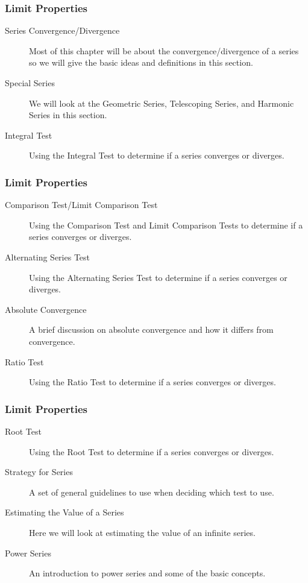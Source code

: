 \documentclass{beamer}
\begin{document}
\begin{frame}[fragile]
	\frametitle{Limit Properties}
	\Large
	\begin{description}
		\item[Series Convergence/Divergence]  Most of this chapter will be about the convergence/divergence of a series so we will give the basic ideas and definitions in this section.
 
\item[Special Series]  We will look at the Geometric Series, Telescoping Series, and Harmonic Series in this section.
 
\item[Integral Test]  Using the Integral Test to determine if a series converges or diverges.
\end{description}
\end{frame}
\begin{frame}[fragile]
	\frametitle{Limit Properties}
	\Large
	\begin{description}
\item[Comparison Test/Limit Comparison Test]  Using the Comparison Test and Limit Comparison Tests to determine if a series converges or diverges.
 
\item[Alternating Series Test]  Using the Alternating Series Test to determine if a series converges or diverges.
 
\item[Absolute Convergence]  A brief discussion on absolute convergence and how it differs from convergence.
 
\item[Ratio Test]  Using the Ratio Test to determine if a series converges or diverges.
\end{description}
\end{frame}
\begin{frame}[fragile]
	\frametitle{Limit Properties}
	\Large
\begin{description}
\item[Root Test]  Using the Root Test to determine if a series converges or diverges.
 
\item[Strategy for Series]  A set of general guidelines to use when deciding which test to use.
 
\item[Estimating the Value of a Series]  Here we will look at estimating the value of an infinite series.
 
\item[Power Series]  An introduction to power series and some of the basic concepts.

\end{description}
\end{frame}
\end{document}
